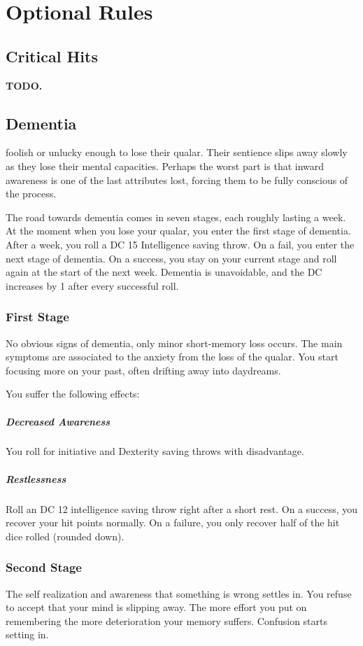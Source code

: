\section{Optional Rules} \label{sec::optionalrules}

\subsection*{Critical Hits} \label{ssec::criticalhits}
    \textbf{TODO.}

\subsection*{Dementia} \label{ssec::dementia}
    foolish or unlucky enough to lose their qualar.
    Their sentience slips away slowly as they lose their mental capacities.
    Perhaps the worst part is that inward awareness is one of the last attributes lost, forcing them to be fully conscious of the process.

    The road towards dementia comes in seven stages, each roughly lasting a week.
    At the moment when you lose your qualar, you enter the first stage of dementia.
    After a week, you roll a DC 15 Intelligence saving throw.
    On a fail, you enter the next stage of dementia.
    On a success, you stay on your current stage and roll again at the start of the next week.
    Dementia is unavoidable, and the DC increases by 1 after every successful roll.

    \subsubsection{First Stage}
    No obvious signs of dementia, only minor short-memory loss occurs.
    The main symptoms are associated to the anxiety from the loss of the qualar.
    You start focusing more on your past, often drifting away into daydreams.

    You suffer the following effects:
    \subparagraph{Decreased Awareness} You roll for initiative and Dexterity saving throws with disadvantage.
    \subparagraph{Restlessness} Roll an DC 12 intelligence saving throw right after a short rest.
    On a success, you recover your hit points normally.
    On a failure, you only recover half of the hit dice rolled (rounded down).

    \subsubsection{Second Stage}
    The self realization and awareness that something is wrong settles in.
    You refuse to accept that your mind is slipping away.
    The more effort you put on remembering the more deterioration your memory suffers.
    Confusion starts setting in.

